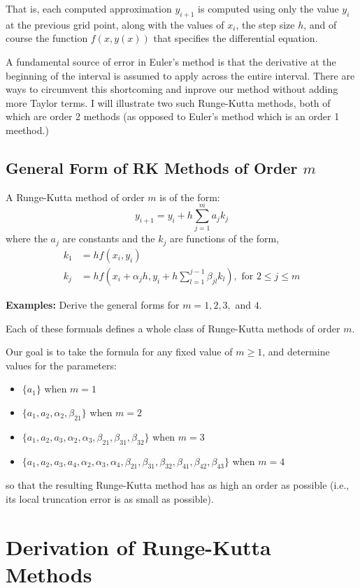 \documentclass [titlepage,12pt,letter] {article}
\begin{document}
That is, each computed approximation $y_{i+1}$ is computed using only the value $y_i$ at the previous grid point, along with the values of $x_i$, the step size $h$, and of course the function $f(x,y(x))$ that specifies the differential equation.

A fundamental source of error in Euler's method is that the derivative at the beginning of the interval is assumed to apply across the entire interval. There are ways to circumvent this shortcoming and inprove our method without adding more Taylor terms. I will illustrate two such Runge-Kutta methods, both of which are order 2 methods (as opposed to Euler's method which is an order 1 meethod.)

\subsection{General Form of RK Methods of Order $m$} 

A Runge-Kutta method of order $m$ is of the form:
\[
y_{i+1}=y_i+h\sum_{j=1}^m a_jk_j
\]
where the $a_j$ are constants and the $k_j$ are functions of the form,
\begin{align*}
k_1&=hf(x_i,y_i) \\
k_j&=hf(x_i+\alpha_jh,y_i+h\sum_{l=1}^{j-1}\beta_{jl}k_l), \text{ for } 2 \leq j \leq m
\end{align*}

{\bf Examples:} Derive the general forms for $m=1,2,3,$ and $4$.

Each of these formuals defines a whole class of Runge-Kutta methods of order $m$.

Our goal is to take the formula for any fixed value of $m \geq 1$, and determine values for the parameters:
\begin{itemize}
\item{$\{a_1 \}$ when $m=1$}
\item{$\{a_1,a_2,\alpha_2,\beta_{21} \}$ when $m=2$}
\item{$\{a_1,a_2,a_3,\alpha_2,\alpha_3,\beta_{21},\beta_{31},\beta_{32} \}$ when $m=3$}
\item{$\{a_1,a_2,a_3,a_4,\alpha_2,\alpha_3,\alpha_4,\beta_{21},\beta_{31},\beta_{32},\beta_{41},\beta_{42},\beta_{43} \}$ when $m=4$}
\end{itemize}
so that the resulting Runge-Kutta method has as high an order as possible (i.e., its local truncation error is as small as possible).

\section{Derivation of Runge-Kutta Methods}
\end{document}
